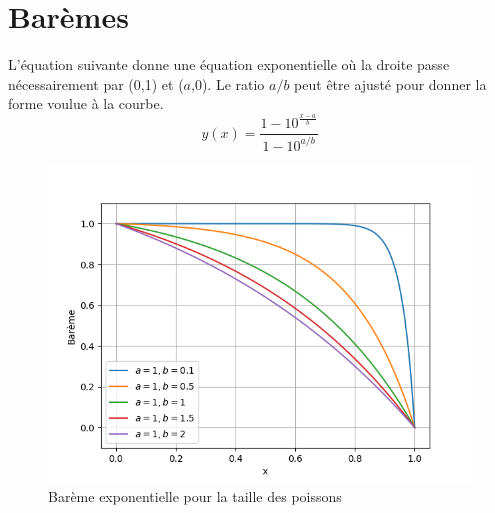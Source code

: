 \chapter{Barèmes}
\label{annexe:baremes}

L'équation suivante donne une équation exponentielle où la droite passe nécessairement par (0,1) et ($a$,0). Le ratio $a/b$ peut être ajusté pour donner la forme voulue à la courbe.
\begin{equation}
    y(x) = \frac{1-10^{\frac{x-a}{b}}}{1-10^{a/b}}
    \label{annexe:bareme_exp_poisson}
\end{equation}

\begin{figure}[h]
    \centering
    \includegraphics[width=0.75\linewidth]{fig/exp_poisson.png}
    \caption{Barème exponentielle pour la taille des poissons}
    \label{fig:exp_poisson}
\end{figure}